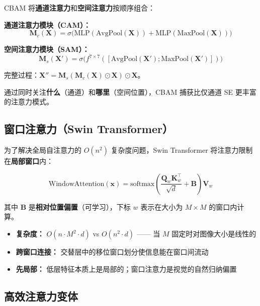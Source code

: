 CBAM \cite{woo2018cbam} 将\textbf{通道注意力}和\textbf{空间注意力}按顺序组合：

\textbf{通道注意力模块（CAM）：}
\begin{equation}
\mathbf{M}_c(\mathbf{X}) = \sigma\bigl(\text{MLP}(\text{AvgPool}(\mathbf{X})) + \text{MLP}(\text{MaxPool}(\mathbf{X}))\bigr)
\end{equation}

\textbf{空间注意力模块（SAM）：}
\begin{equation}
\mathbf{M}_s(\mathbf{X'}) = \sigma\bigl(f^{7 \times 7}([\text{AvgPool}(\mathbf{X'}); \text{MaxPool}(\mathbf{X'})])\bigr)
\end{equation}

完整过程：$\mathbf{X}'' = \mathbf{M}_s(\mathbf{M}_c(\mathbf{X}) \odot \mathbf{X}) \odot \mathbf{X}$。

通过同时关注\textbf{什么}（通道）和\textbf{哪里}（空间位置），CBAM 捕获比仅通道 SE 更丰富的注意力模式。

\subsection{窗口注意力（Swin Transformer）}

为了解决全局自注意力的 $O(n^2)$ 复杂度问题，Swin Transformer \cite{liu2021swin} 将注意力限制在\textbf{局部窗口}内：

\begin{equation}
\text{WindowAttention}(\mathbf{x}) = \text{softmax}\left(\frac{\mathbf{Q}_w \mathbf{K}_w^\top}{\sqrt{d}} + \mathbf{B}\right)\mathbf{V}_w
\end{equation}

其中 $\mathbf{B}$ 是\textbf{相对位置偏置}（可学习），下标 $w$ 表示在大小为 $M \times M$ 的窗口内计算。

\begin{properties}
\begin{itemize}
    \item \textbf{复杂度：} $O(n \cdot M^2 \cdot d)$ vs $O(n^2 \cdot d)$ —— 当 $M$ 固定时对图像大小是线性的
    \item \textbf{跨窗口连接：} 交替层中的移位窗口划分使信息能在窗口间流动
    \item \textbf{先局部：} 低层特征本质上是局部的；窗口注意力是视觉的自然归纳偏置
\end{itemize}
\end{properties}

\subsection{高效注意力变体}

